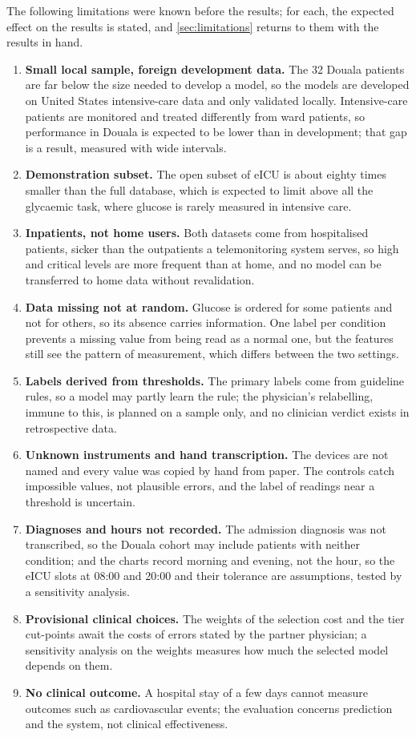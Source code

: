 \documentclass[11pt,a4paper,oneside]{report}
\begin{document}
The following limitations were known before the results; for each, the expected effect on the results is stated, and \cref{sec:limitations} returns to them with the results in hand.
\begin{enumerate}
  \item \textbf{Small local sample, foreign development data.} The 32 Douala patients are far below the size needed to develop a model, so the models are developed on United States intensive-care data and only validated locally. Intensive-care patients are monitored and treated differently from ward patients, so performance in Douala is expected to be lower than in development; that gap is a result, measured with wide intervals.
  \item \textbf{Demonstration subset.} The open subset of eICU is about eighty times smaller than the full database, which is expected to limit above all the glycaemic task, where glucose is rarely measured in intensive care.
  \item \textbf{Inpatients, not home users.} Both datasets come from hospitalised patients, sicker than the outpatients a telemonitoring system serves, so high and critical levels are more frequent than at home, and no model can be transferred to home data without revalidation.
  \item \textbf{Data missing not at random.} Glucose is ordered for some patients and not for others, so its absence carries information. One label per condition prevents a missing value from being read as a normal one, but the features still see the pattern of measurement, which differs between the two settings.
  \item \textbf{Labels derived from thresholds.} The primary labels come from guideline rules, so a model may partly learn the rule; the physician's relabelling, immune to this, is planned on a sample only, and no clinician verdict exists in retrospective data.
  \item \textbf{Unknown instruments and hand transcription.} The devices are not named and every value was copied by hand from paper. The controls catch impossible values, not plausible errors, and the label of readings near a threshold is uncertain.
  \item \textbf{Diagnoses and hours not recorded.} The admission diagnosis was not transcribed, so the Douala cohort may include patients with neither condition; and the charts record morning and evening, not the hour, so the eICU slots at 08:00 and 20:00 and their tolerance are assumptions, tested by a sensitivity analysis.
  \item \textbf{Provisional clinical choices.} The weights of the selection cost and the tier cut-points await the costs of errors stated by the partner physician; a sensitivity analysis on the weights measures how much the selected model depends on them.
  \item \textbf{No clinical outcome.} A hospital stay of a few days cannot measure outcomes such as cardiovascular events; the evaluation concerns prediction and the system, not clinical effectiveness.
\end{enumerate}
\end{document}

